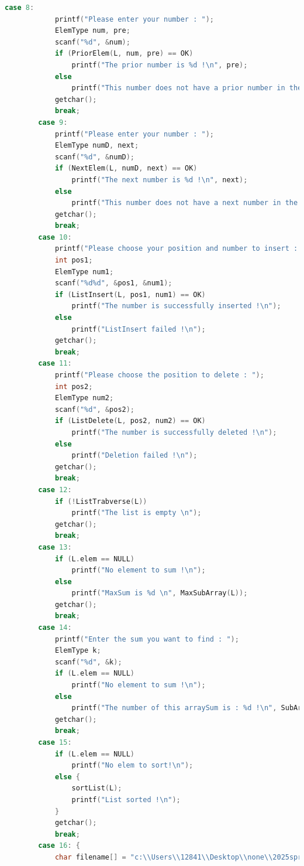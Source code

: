 \documentclass[supercite]{Experimental_Report}
\theoremstyle{definition}
\begin{document}
\begin{lstlisting}[language=c]
        case 8:
            printf("Please enter your number : ");
            ElemType num, pre;
            scanf("%d", &num);
            if (PriorElem(L, num, pre) == OK)
                printf("The prior number is %d !\n", pre);
            else
                printf("This number does not have a prior number in the table !\n");
            getchar();
            break;
        case 9:
            printf("Please enter your number : ");
            ElemType numD, next;
            scanf("%d", &numD);
            if (NextElem(L, numD, next) == OK)
                printf("The next number is %d !\n", next);
            else
                printf("This number does not have a next number in the table !\n");
            getchar();
            break;
        case 10:
            printf("Please choose your position and number to insert : ");
            int pos1;
            ElemType num1;
            scanf("%d%d", &pos1, &num1);
            if (ListInsert(L, pos1, num1) == OK)
                printf("The number is successfully inserted !\n");
            else
                printf("ListInsert failed !\n");
            getchar();
            break;
        case 11:
            printf("Please choose the position to delete : ");
            int pos2;
            ElemType num2;
            scanf("%d", &pos2);
            if (ListDelete(L, pos2, num2) == OK)
                printf("The number is successfully deleted !\n");
            else
                printf("Deletion failed !\n");
            getchar();
            break;
        case 12:
            if (!ListTrabverse(L))
                printf("The list is empty \n");
            getchar();
            break;
        case 13:
            if (L.elem == NULL)
                printf("No element to sum !\n");
            else
                printf("MaxSum is %d \n", MaxSubArray(L));
            getchar();
            break;
        case 14:
            printf("Enter the sum you want to find : ");
            ElemType k;
            scanf("%d", &k);
            if (L.elem == NULL)
                printf("No element to sum !\n");
            else
                printf("The number of this arraySum is : %d !\n", SubArrayNum(L, k));
            getchar();
            break;
        case 15:
            if (L.elem == NULL)
                printf("No elem to sort!\n");
            else {
                sortList(L);
                printf("List sorted !\n");
            }
            getchar();
            break;
        case 16: {
            char filename[] = "c:\\Users\\12841\\Desktop\\none\\2025springDS\\experiments\\ex1\\list1.txt";

\end{lstlisting}
\end{document}
